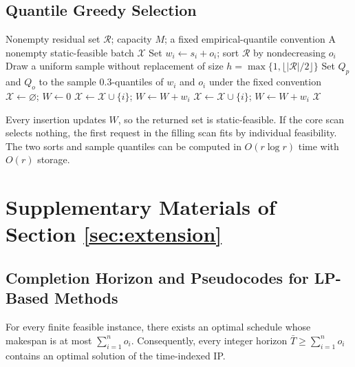\documentclass[nonblindrev]{informs3_hide}
\begin{document}
\subsection{Quantile Greedy Selection}
\begin{algorithm}[htbp]
\caption{Quantile Greedy Selection}
\label{alg:quantile_greedy}
\begin{algorithmic}[1]
\Require Nonempty residual set $\mathcal R$; capacity $M$; a fixed empirical-quantile convention
\Ensure A nonempty static-feasible batch $\mathcal X$
\State Set $w_i\gets s_i+o_i$; sort $\mathcal R$ by nondecreasing $o_i$
\State Draw a uniform sample without replacement of size $h=\max\{1,\lfloor|\mathcal R|/2\rfloor\}$
\State Set $Q_p$ and $Q_o$ to the sample $0.3$-quantiles of $w_i$ and $o_i$ under the fixed convention
\State $\mathcal X\gets\varnothing$; $W\gets0$
    \State $\mathcal X\gets\mathcal X\cup\{i\}$; $W\gets W+w_i$
  \EndIf
\EndFor
{}
    \State $\mathcal X\gets\mathcal X\cup\{i\}$; $W\gets W+w_i$
  \EndIf
\EndFor
\State \Return $\mathcal X$
\end{algorithmic}
\end{algorithm}

Every insertion updates $W$, so the returned set is
static-feasible. If the core scan selects nothing, the first request in
the filling scan fits by individual feasibility. The two sorts and sample
quantiles can be computed in $O(r\log r)$ time with $O(r)$ storage.


\section{Supplementary Materials of Section \ref{sec:extension}} \label{append:extension}

\subsection{Completion Horizon and Pseudocodes for LP-Based Methods} \label{append:extension_pseudo}

\begin{lemma}
For every finite feasible instance, there exists an optimal schedule whose makespan is at most $\sum_{i=1}^n o_i$. Consequently, every integer horizon $\bar T\ge \sum_{i=1}^n o_i$ contains an optimal solution of the time-indexed IP.
\end{lemma}
\end{document}
